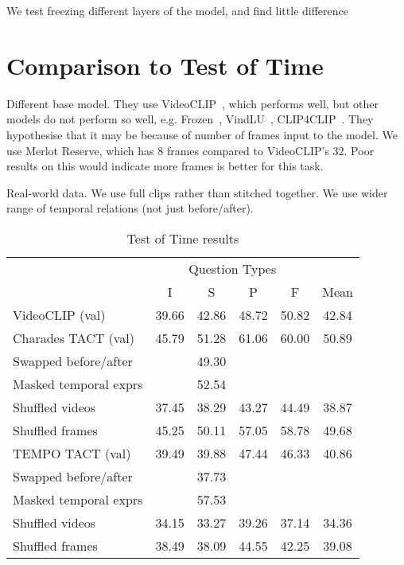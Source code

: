 We test freezing different layers of the model, and find little difference


\section{Comparison to Test of Time}
\label{sec:tactcompare}

Different base model. They use VideoCLIP~\citep{xu2021videoclip}, which performs well,
but other models do not perform so well, e.g. Frozen~\citep{bain2021frozen}, 
VindLU~\citep{cheng2023vindlu}, CLIP4CLIP~\citep{luo2022clip4clip}. They hypothesise
that it may be because of number of frames input to the model. We use Merlot Reserve,
which has 8 frames compared to VideoCLIP's 32. Poor results on this would indicate
more frames is better for this task.

Real-world data. We use full clips rather than stitched together. We use wider range
of temporal relations (not just before/after).

\begin{table}[tp] 
    \centering 
    \caption{Test of Time results}
    \label{tab:tot_star} 
    \begin{tabular}{lccccc} 
        \toprule
        \multicolumn{1}{c}{}    & \multicolumn{4}{c}{Question Types}            & \multicolumn{1}{c}{} \\
                                    \cmidrule(){2-5}
                                & I           & S        & P          & F           & Mean \\
        \cmidrule(r){1-1}           \cmidrule(){2-5}                                    \cmidrule(l){6-6}
        VideoCLIP (val)         & 39.66       & 42.86    & 48.72      & 50.82       & 42.84 \\
		Charades TACT (val)		& 45.79		  & 51.28	 & 61.06	  & 60.00		& 50.89 \\
		Swapped before/after    &			  &	49.30	 &			  &				& \\
		Masked temporal exprs   &			  & 52.54    &			  &				& \\
		Shuffled videos			& 37.45		  & 38.29	 & 43.27	  & 44.49		& 38.87 \\
		Shuffled frames			& 45.25		  & 50.11    & 57.05      & 58.78		& 49.68 \\
        \cmidrule(r){1-1}           \cmidrule(){2-5}                                    \cmidrule(l){6-6}
		TEMPO TACT (val)		& 39.49		  & 39.88	 & 47.44	  & 46.33		& 40.86 \\
		Swapped before/after    &			  & 37.73    &			  &				& \\
		Masked temporal exprs   &			  & 57.53    &			  &				& \\
		Shuffled videos			& 34.15		  & 33.27	 & 39.26	  & 37.14		& 34.36 \\
		Shuffled frames			& 38.49		  & 38.09	 & 44.55	  & 42.25		& 39.08 \\
        \bottomrule
    \end{tabular} 
\end{table} 
